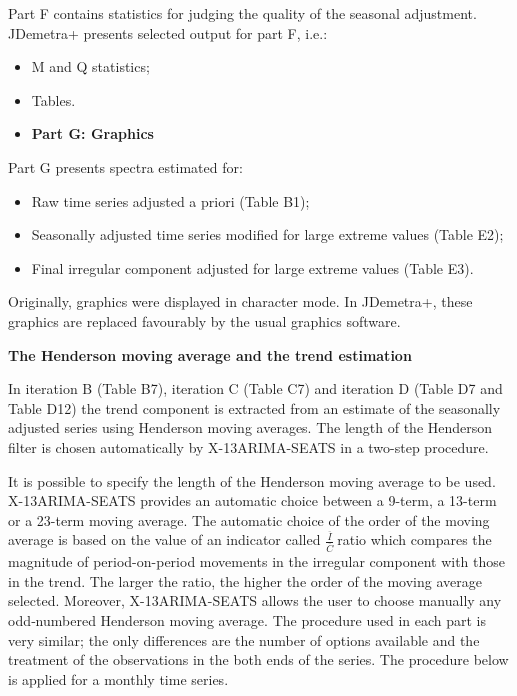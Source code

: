 \documentclass[
]{book}
\providecommand{\tightlist}{%
  \setlength{\itemsep}{0pt}\setlength{\parskip}{0pt}}
\begin{document}
Part F contains statistics for judging the quality of the seasonal
adjustment. JDemetra+ presents selected output for part F, i.e.:

\begin{itemize}
\item
  M and Q statistics;
\item
  Tables.
\end{itemize}

\begin{itemize}
\tightlist
\item
  \textbf{Part G: Graphics}
\end{itemize}

Part G presents spectra estimated for:

\begin{itemize}
\item
  Raw time series adjusted a priori (Table B1);
\item
  Seasonally adjusted time series modified for large extreme values
  (Table E2);
\item
  Final irregular component adjusted for large extreme values (Table
  E3).
\end{itemize}

Originally, graphics were displayed in character mode. In JDemetra+,
these graphics are replaced favourably by the usual graphics software.

\textbf{The Henderson moving average and the trend estimation}

In iteration B (Table B7), iteration C (Table C7) and iteration D (Table
D7 and Table D12) the trend component is extracted from an estimate of
the seasonally adjusted series using Henderson moving averages. The
length of the Henderson filter is chosen automatically by
X-13ARIMA-SEATS in a two-step procedure.

It is possible to specify the length of the Henderson moving average to
be used. X-13ARIMA-SEATS provides an automatic choice between a 9-term,
a 13-term or a 23-term moving average. The automatic choice of the order
of the moving average is based on the value of an indicator called
\(\frac{\overline{I}}{\overline{C}}\ \)ratio which compares the magnitude
of period-on-period movements in the irregular component with those in
the trend. The larger the ratio, the higher the order of the moving
average selected. Moreover, X-13ARIMA-SEATS allows the user to choose
manually any odd‑numbered Henderson moving average. The procedure used
in each part is very similar; the only differences are the number of
options available and the treatment of the observations in the both ends
of the series. The procedure below is applied for a monthly time series.
\end{document}
